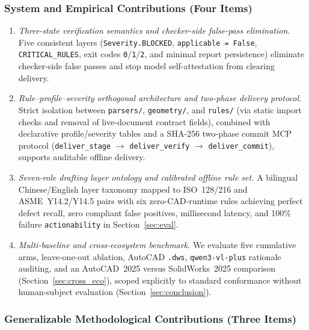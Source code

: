 \documentclass[nocopyright,nolists,upint,varvw,hyphenate]{asmejour}
\begin{document}
\subsubsection{System and Empirical Contributions (Four Items)}\leavevmode

\begin{enumerate}
\item \emph{Three-state verification semantics and checker-side false-pass elimination.} Five consistent layers (\texttt{Severity.BLOCKED}, \texttt{applicable = False}, \texttt{CRITICAL\_RULES}, exit codes \texttt{0}/\texttt{1}/\texttt{2}, and minimal report persistence) eliminate checker-side false passes and stop model self-attestation from clearing delivery.
\item \emph{Rule--profile--severity orthogonal architecture and two-phase delivery protocol.} Strict isolation between \texttt{parsers/}, \texttt{geometry/}, and \texttt{rules/} (via static import checks and removal of live-document contract fields), combined with declarative profile/severity tables and a SHA-256 two-phase commit MCP protocol (\texttt{deliver\_stage} $\to$ \texttt{deliver\_verify} $\to$ \texttt{deliver\_commit}), supports auditable offline delivery.
\item \emph{Seven-role drafting layer ontology and calibrated offline rule set.} A bilingual Chinese/English layer taxonomy mapped to ISO~128/216 and ASME~Y14.2/Y14.5 pairs with six zero-CAD-runtime rules achieving perfect defect recall, zero compliant false positives, millisecond latency, and 100\% failure \texttt{actionability} in Section~\ref{sec:eval}.
\item \emph{Multi-baseline and cross-ecosystem benchmark.} We evaluate five cumulative arms, leave-one-out ablation, AutoCAD \texttt{.dws}, \texttt{qwen3-vl-plus} rationale auditing, and an AutoCAD~2025 versus SolidWorks~2025 comparison (Section~\ref{sec:cross_eco}), scoped explicitly to standard conformance without human-subject evaluation (Section~\ref{sec:conclusion}).
\end{enumerate}

\subsubsection{Generalizable Methodological Contributions (Three Items)}\leavevmode
\end{document}
